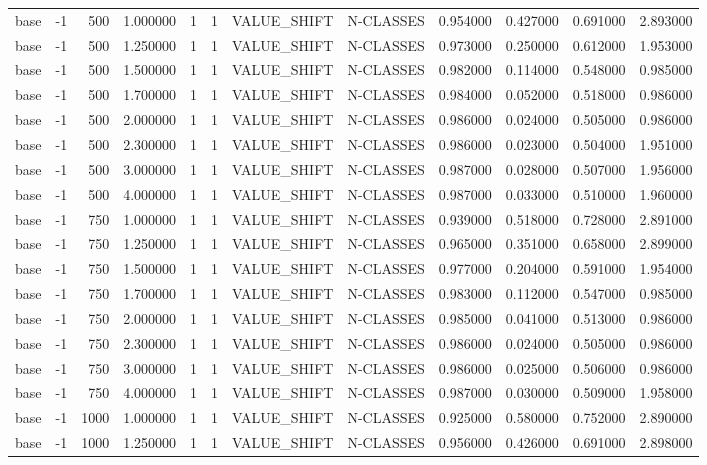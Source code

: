 \begin{tabular}{lrrrllllrrrr}
base & -1 & 500 & 1.000000 & 1 & 1 & VALUE_SHIFT & N-CLASSES & 0.954000 & 0.427000 & 0.691000 & 2.893000 \\
base & -1 & 500 & 1.250000 & 1 & 1 & VALUE_SHIFT & N-CLASSES & 0.973000 & 0.250000 & 0.612000 & 1.953000 \\
base & -1 & 500 & 1.500000 & 1 & 1 & VALUE_SHIFT & N-CLASSES & 0.982000 & 0.114000 & 0.548000 & 0.985000 \\
base & -1 & 500 & 1.700000 & 1 & 1 & VALUE_SHIFT & N-CLASSES & 0.984000 & 0.052000 & 0.518000 & 0.986000 \\
base & -1 & 500 & 2.000000 & 1 & 1 & VALUE_SHIFT & N-CLASSES & 0.986000 & 0.024000 & 0.505000 & 0.986000 \\
base & -1 & 500 & 2.300000 & 1 & 1 & VALUE_SHIFT & N-CLASSES & 0.986000 & 0.023000 & 0.504000 & 1.951000 \\
base & -1 & 500 & 3.000000 & 1 & 1 & VALUE_SHIFT & N-CLASSES & 0.987000 & 0.028000 & 0.507000 & 1.956000 \\
base & -1 & 500 & 4.000000 & 1 & 1 & VALUE_SHIFT & N-CLASSES & 0.987000 & 0.033000 & 0.510000 & 1.960000 \\
base & -1 & 750 & 1.000000 & 1 & 1 & VALUE_SHIFT & N-CLASSES & 0.939000 & 0.518000 & 0.728000 & 2.891000 \\
base & -1 & 750 & 1.250000 & 1 & 1 & VALUE_SHIFT & N-CLASSES & 0.965000 & 0.351000 & 0.658000 & 2.899000 \\
base & -1 & 750 & 1.500000 & 1 & 1 & VALUE_SHIFT & N-CLASSES & 0.977000 & 0.204000 & 0.591000 & 1.954000 \\
base & -1 & 750 & 1.700000 & 1 & 1 & VALUE_SHIFT & N-CLASSES & 0.983000 & 0.112000 & 0.547000 & 0.985000 \\
base & -1 & 750 & 2.000000 & 1 & 1 & VALUE_SHIFT & N-CLASSES & 0.985000 & 0.041000 & 0.513000 & 0.986000 \\
base & -1 & 750 & 2.300000 & 1 & 1 & VALUE_SHIFT & N-CLASSES & 0.986000 & 0.024000 & 0.505000 & 0.986000 \\
base & -1 & 750 & 3.000000 & 1 & 1 & VALUE_SHIFT & N-CLASSES & 0.986000 & 0.025000 & 0.506000 & 0.986000 \\
base & -1 & 750 & 4.000000 & 1 & 1 & VALUE_SHIFT & N-CLASSES & 0.987000 & 0.030000 & 0.509000 & 1.958000 \\
base & -1 & 1000 & 1.000000 & 1 & 1 & VALUE_SHIFT & N-CLASSES & 0.925000 & 0.580000 & 0.752000 & 2.890000 \\
base & -1 & 1000 & 1.250000 & 1 & 1 & VALUE_SHIFT & N-CLASSES & 0.956000 & 0.426000 & 0.691000 & 2.898000 \\

\end{tabular}
